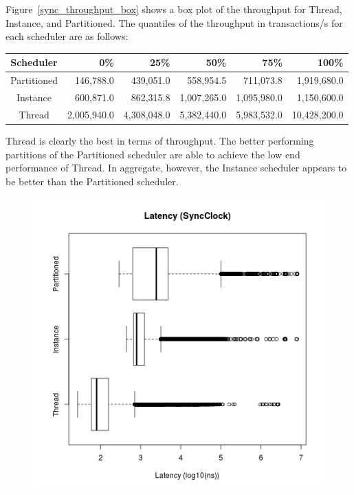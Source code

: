 Figure~\ref{sync_throughput_box} shows a box plot of the throughput for Thread, Instance, and Partitioned.
The quantiles of the throughput in transactions/s for each scheduler are as follows:
\begin{center}
\begin{tabular}{crrrrr}
Scheduler   &       0\%   &    25\%     &    50\%     &    75\%     &   100\% \\
\hline
Partitioned &   146,788.0 &   439,051.0 &   558,954.5 &   711,073.8 &  1,919,680.0 \\
Instance    &   600,871.0 &   862,315.8 & 1,007,265.0 & 1,095,980.0 &  1,150,600.0 \\
Thread      & 2,005,940.0 & 4,308,048.0 & 5,382,440.0 & 5,983,532.0 & 10,428,200.0 \\
\end{tabular}
\end{center}
Thread is clearly the best in terms of throughput.
The better performing partitions of the Partitioned scheduler are able to achieve the low end performance of Thread.
In aggregate, however, the Instance scheduler appears to be better than the Partitioned scheduler.

\begin{figure}
\center
\includegraphics[height=.4\textheight]{sync_latency_box.png}
\caption{\label{sync_latency_box}}
\end{figure}

